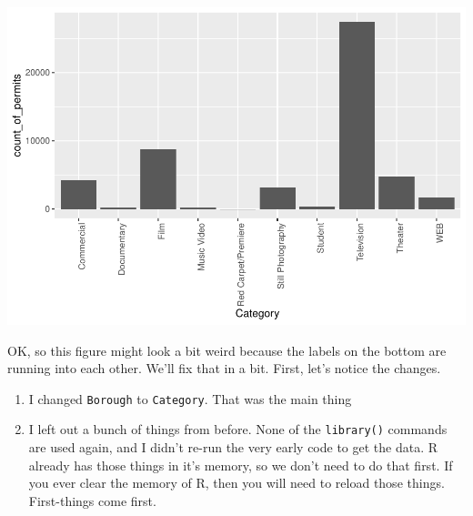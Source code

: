 \documentclass[]{book}
\newenvironment{Shaded}{\begin{snugshade}}{\end{snugshade}}
\newcommand{\KeywordTok}[1]{\textcolor[rgb]{0.13,0.29,0.53}{\textbf{#1}}}
\newcommand{\DataTypeTok}[1]{\textcolor[rgb]{0.13,0.29,0.53}{#1}}
\newcommand{\DecValTok}[1]{\textcolor[rgb]{0.00,0.00,0.81}{#1}}
\newcommand{\StringTok}[1]{\textcolor[rgb]{0.31,0.60,0.02}{#1}}
\newcommand{\OperatorTok}[1]{\textcolor[rgb]{0.81,0.36,0.00}{\textbf{#1}}}
\newcommand{\NormalTok}[1]{#1}
\begin{document}
\begin{Shaded}
\end{Shaded}

\includegraphics{Statistics_Lab_files/figure-latex/1category-1.pdf}

OK, so this figure might look a bit weird because the labels on the
bottom are running into each other. We'll fix that in a bit. First,
let's notice the changes.

\begin{enumerate}
\def\labelenumi{\arabic{enumi}.}
\item
  I changed \texttt{Borough} to \texttt{Category}. That was the main
  thing
\item
  I left out a bunch of things from before. None of the
  \texttt{library()} commands are used again, and I didn't re-run the
  very early code to get the data. R already has those things in it's
  memory, so we don't need to do that first. If you ever clear the
  memory of R, then you will need to reload those things. First-things
  come first.
\end{enumerate}
\end{document}
